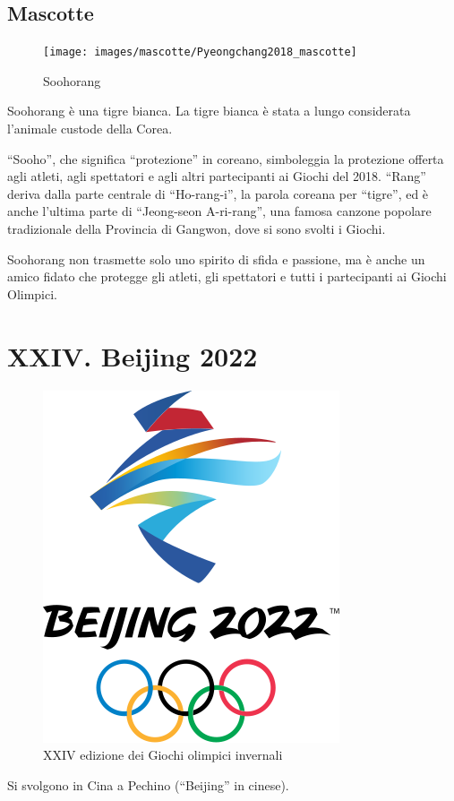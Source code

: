 \documentclass[
]{book}
\begin{document}
\section*{Mascotte}\label{mascotte-12}

\begin{figure}
\texttt{[image: images/mascotte/Pyeongchang2018\_mascotte]} \caption{Soohorang}\label{fig:unnamed-chunk-91}
\end{figure}

Soohorang è una tigre bianca.
La tigre bianca è stata a lungo considerata l'animale custode della Corea.

``Sooho'', che significa ``protezione'' in coreano, simboleggia la protezione offerta agli atleti, agli spettatori e agli altri partecipanti ai Giochi del 2018.
``Rang'' deriva dalla parte centrale di ``Ho-rang-i'', la parola coreana per ``tigre'', ed è anche l'ultima parte di ``Jeong-seon A-ri-rang'', una famosa canzone popolare tradizionale della Provincia di Gangwon, dove si sono svolti i Giochi.

Soohorang non trasmette solo uno spirito di sfida e passione, ma è anche un amico fidato che protegge gli atleti, gli spettatori e tutti i partecipanti ai Giochi Olimpici.

\chapter*{XXIV. Beijing 2022}\label{xxiv.-beijing-2022}

\begin{figure}
\includegraphics[width=0.4\linewidth]{images/loghi/2022} \caption{XXIV edizione dei Giochi olimpici invernali}\label{fig:unnamed-chunk-92}
\end{figure}

Si svolgono in Cina a Pechino (``Beijing'' in cinese).
\end{document}
